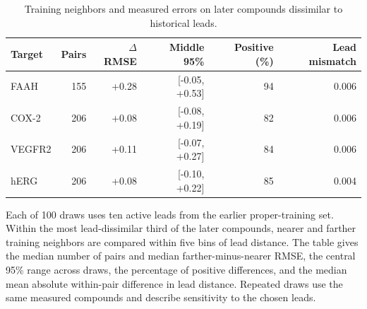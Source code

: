 \begin{table}[htbp]
\centering
\caption{Training neighbors and measured errors on later compounds dissimilar to historical leads.}
\label{tab:extension-temporal-leads}
\small
\begin{tabular}{lrrrrr}
\toprule
Target & Pairs & $\Delta$RMSE & Middle 95\% & Positive (\%) & Lead mismatch \\
\midrule
FAAH & 155 & +0.28 & [-0.05, +0.53] & 94 & 0.006 \\
COX-2 & 206 & +0.08 & [-0.08, +0.19] & 82 & 0.006 \\
VEGFR2 & 206 & +0.11 & [-0.07, +0.27] & 84 & 0.006 \\
hERG & 206 & +0.08 & [-0.10, +0.22] & 85 & 0.004 \\
\bottomrule
\end{tabular}
\par\smallskip
\begin{minipage}{0.98\linewidth}\footnotesize Each of 100 draws uses ten active leads from the earlier proper-training set. Within the most lead-dissimilar third of the later compounds, nearer and farther training neighbors are compared within five bins of lead distance. The table gives the median number of pairs and median farther-minus-nearer RMSE, the central 95\% range across draws, the percentage of positive differences, and the median mean absolute within-pair difference in lead distance. Repeated draws use the same measured compounds and describe sensitivity to the chosen leads.\end{minipage}
\end{table}
